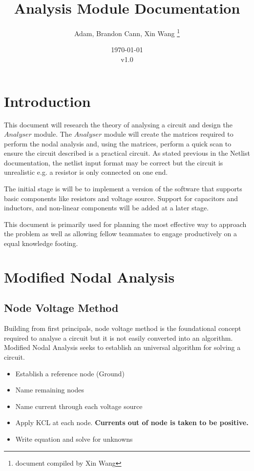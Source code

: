 \documentclass[a4paper, titlepage]{article}
\title{Analysis Module Documentation}
\author{Adam, Brandon Cann, Xin Wang \thanks{document compiled by Xin Wang}}
\date{ \today \\ v1.0}
\begin{document}
    \maketitle
    \tableofcontents
    \pagebreak
    \section{Introduction}
    \par
    This document will research the theory of analysing a circuit and design the $Analyser$ module.
    The $Analyser$ module will create the matrices required to perform the nodal analysis and, using the 
    matrices, perform a quick scan to ensure the circuit described is a practical circuit. As stated previous
    in the Netlist documentation, the netlist input format may be correct but the circuit is unrealistic 
    e.g. a resistor is only connected on one end.
    \par
    The initial stage is will be to implement a version of the software that supports basic components
    like resistors and voltage source. Support for capacitors and inductors, and non-linear components 
    will be added at a later stage.
    \par
    This document is primarily used for planning the most effective way to approach the problem
    as well as allowing fellow teammates to engage productively on a equal knowledge footing. 
    
    \pagebreak
    \section{Modified Nodal Analysis}
    \subsection{Node Voltage Method}
    Building from first principals, node voltage method is the foundational concept required 
    to analyse a circuit but it is not easily converted into an algorithm. Modified Nodal Analysis seeks
    to establish an universal algorithm for solving a circuit.
    
    \begin{itemize}
        \item Establish a reference node (Ground)
        \item Name remaining nodes
        \item Name current through each voltage source
        \item Apply KCL at each node. \textbf{Currents out of node is taken to be positive.}
        \item Write equation and solve for unknowns
    \end{itemize}
\end{document}

